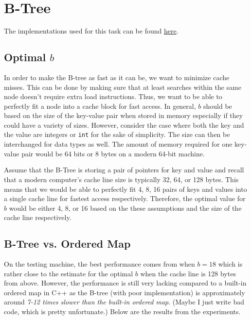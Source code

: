 \section{B-Tree}

\begin{tcolorbox}
	The implementations used for this task can be found \href{https://github.com/nngerncham/cs315_apal/tree/main/assignments/asn01/05-btree}{here}.
\end{tcolorbox}

\subsection{Optimal $b$}

In order to make the B-tree as fast as it can be, we want to minimize cache misses. This can be done by making sure that at least searches within the same node doesn't require extra load instructions. Thus, we want to be able to perfectly fit a node into a cache block for fast access.
In general, $b$ should be based on the size of the key-value pair when stored in memory especially if they could have a variety of sizes.
However, consider the case where both the key and the value are integers or \texttt{int} for the sake of simplicity.
The size can then be interchanged for data types as well.
The amount of memory required for one key-value pair would be 64 bits or 8 bytes on a modern 64-bit machine.

Assume that the B-Tree is storing a pair of pointers for key and value and recall that a modern computer's cache line size is typically 32, 64, or 128 bytes. This means that we would be able to perfectly fit 4, 8, 16 pairs of keys and values into a single cache line for fastest access respectively. Therefore, the optimal value for $b$ would be either 4, 8, or 16 based on the these assumptions and the size of the cache line respectively.

\subsection{B-Tree vs. Ordered Map}

On the testing machine, the best performance comes from when $b = 18$ which is rather close to the estimate for the optimal $b$ when the cache line is 128 bytes from above. However, the performance is still very lacking compared to a built-in ordered map in C++ as the B-tree (with poor implementation) is approximately around \textit{7-12 times slower than the built-in ordered map}. (Maybe I just write bad code, which is pretty unfortunate.) Below are the results from the experiments.

